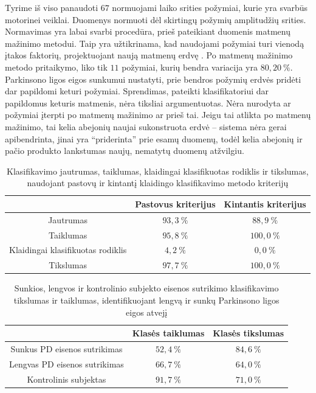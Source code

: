 \documentclass[]{vgtuef}
\begin{document}
Tyrime iš viso panaudoti $67$ normuojami laiko srities požymiai, kurie yra svarbūs motorinei veiklai. Duomenys normuoti dėl skirtingų požymių amplitudžių srities. Normavimas yra labai svarbi procedūra, prieš pateikiant duomenis matmenų mažinimo metodui. Taip yra užtikrinama, kad naudojami požymiai turi vienodą įtakos faktorių, projektuojant naują matmenų erdvę \cite{824819}. Po matmenų mažinimo metodo pritaikymo, liko tik $11$ požymiai, kurių bendra variacija yra $80,20~\%$. Parkinsono ligos eigos sunkumui nustatyti, prie bendros požymių erdvės pridėti dar papildomi keturi požymiai. Sprendimas, pateikti klasifikatoriui dar papildomus keturis matmenis, nėra tiksliai argumentuotas. Nėra nurodyta ar požymiai įterpti po matmenų mažinimo ar prieš tai. Jeigu tai atlikta po matmenų mažinimo, tai kelia abejonių naujai sukonstruota erdvė -- sistema nėra gerai apibendrinta, jinai yra ``priderinta'' prie esamų duomenų, todėl kelia abejonių ir pačio produkto lankstumas naujų, nematytų duomenų atžvilgiu. 

\begin{table}
	\centering
  \renewcommand{\arraystretch}{1.3}
	\caption{Klasifikavimo jautrumas, taiklumas, klaidingai klasifikuotas rodiklis ir tikslumas, naudojant pastovų ir kintantį klaidingo klasifikavimo metodo kriterijų \cite{5627904}}
	\label{table:wireless_svm_pd_recognition}
	\begin{tabular}{|c|c|c|} \hline
		& Pastovus kriterijus & Kintantis kriterijus \\ \hline
	Jautrumas & $93,3~\%$ & $88,9~\%$ \\ \hline
	Taiklumas & $95,8~\%$ & $100,0~\%$ \\ \hline
	Klaidingai klasifikuotas rodiklis & $4,2~\%$ & $0,0~\%$ \\ \hline
	Tikslumas & $97,7~\%$ & $100,0~\%$ \\ \hline
	\end{tabular}
\end{table}

\begin{table}
	\centering
	\renewcommand{\arraystretch}{1.3}
	\caption{Sunkios, lengvos ir kontrolinio subjekto eisenos sutrikimo klasifikavimo tikslumas ir taiklumas, identifikuojant lengvą ir sunkų Parkinsono ligos eigos atvejį \cite{5627904}}
	\label{table:wireless_svm_recognition}
	\begin{tabular}{|c|c|c|} \hline
		& Klasės taiklumas & Klasės tikslumas \\ \hline
	Sunkus PD eisenos sutrikimas & $52,4~\%$ & $84,6~\%$ \\ \hline
	Lengvas PD eisenos sutrikimas & $66,7~\%$ & $64,0~\%$ \\ \hline
	Kontrolinis subjektas & $91,7~\%$ & $71,0~\%$ \\ \hline
	\end{tabular}
\end{table}
\end{document}
